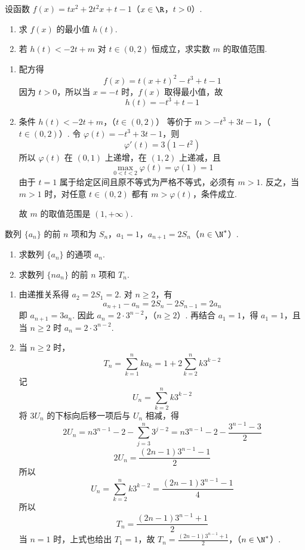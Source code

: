 \begin{problem}
设函数 \(f(x) = tx^2 + 2t^2x + t - 1\)（\(x \in \R\)，\(t > 0\)）.

\begin{enumerate}
\item 求 \(f(x)\) 的最小值 \(h(t)\).
\item 若 \(h(t) < -2t + m\) 对 \(t \in (0, 2)\) 恒成立，求实数 \(m\) 的取值范围.
\end{enumerate}
\end{problem}

\begin{solution}
\begin{enumerate}
\item 配方得
\[
f(x)=t\left(x+t\right)^2-t^3+t-1
\]
因为 \(t>0\)，所以当 \(x=-t\) 时，\(f(x)\) 取得最小值，故
\[
h(t)=-t^3+t-1
\]
\item 条件
\(h(t)<-2t+m\)，（\(t\in(0,2)\)）
等价于
\(m>-t^3+3t-1\)，（\(t\in(0,2)\)）.
令 \(\varphi(t)=-t^3+3t-1\)，则
\[
\varphi'(t)=3(1-t^2)
\]
所以 \(\varphi(t)\) 在 \((0,1)\) 上递增，在 \((1,2)\) 上递减，且
\[
\max_{0<t<2}\varphi(t)=\varphi(1)=1
\]
由于 \(t=1\) 属于给定区间且原不等式为严格不等式，必须有 \(m>1\). 反之，当 \(m>1\) 时，对任意 \(t\in(0,2)\) 都有 \(m>\varphi(t)\)，条件成立.

故 \(m\) 的取值范围是 \((1,+\infty)\).
\end{enumerate}
\end{solution}

\begin{problem}
数列 \(\{a_n\}\) 的前 \(n\) 项和为 \(S_n\)，\(a_1 = 1\)，\(a_{n+1} = 2S_n\)（\(n \in \N^*\)）.

\begin{enumerate}
\item 求数列 \(\{a_n\}\) 的通项 \(a_n\).
\item 求数列 \(\{na_n\}\) 的前 \(n\) 项和 \(T_n\).
\end{enumerate}
\end{problem}

\begin{solution}
\begin{enumerate}
\item 由递推关系得 \(a_2=2S_1=2\). 对 \(n\geqslant2\)，有
\[
a_{n+1}-a_n=2S_n-2S_{n-1}=2a_n
\]
即 \(a_{n+1}=3a_n\). 因此
\(a_n=2\cdot3^{n-2}\)，（\(n\geqslant2\)）.
再结合 \(a_1=1\)，得 \(a_1=1\)，且当 \(n\geqslant2\) 时 \(a_n=2\cdot3^{n-2}\).
\item 当 \(n\geqslant2\) 时，
\[
T_n=\sum_{k=1}^{n}ka_k
 =1+2\sum_{k=2}^{n}k3^{k-2}
\]
记
\[
U_n=\sum_{k=2}^{n}k3^{k-2}
\]
将 \(3U_n\) 的下标向后移一项后与 \(U_n\) 相减，得
\[
2U_n=n3^{n-1}-2-\sum_{j=3}^{n}3^{j-2}
 =n3^{n-1}-2-\frac{3^{n-1}-3}{2}
\]
\[
2U_n=\frac{(2n-1)3^{n-1}-1}{2}
\]
所以
\[
U_n=\sum_{k=2}^{n}k3^{k-2}
 =\frac{(2n-1)3^{n-1}-1}{4}
\]
所以
\[
T_n=\frac{(2n-1)3^{n-1}+1}{2}
\]
当 \(n=1\) 时，上式也给出 \(T_1=1\)，故
\(T_n=\frac{(2n-1)3^{n-1}+1}{2}\)，（\(n\in\N^*\)）.
\end{enumerate}
\end{solution}

